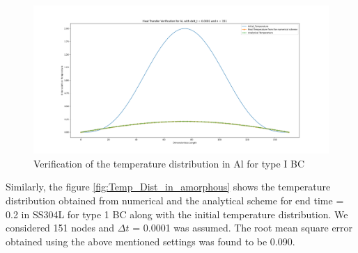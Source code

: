 \begin{figure}[h]
  \centering
  \includegraphics[width=15cm]{img/Al_Type1.png}
  \caption{Verification of the temperature distribution in Al for type I BC}
  \label{fig:Temp_Dist_in_crystal}
\end{figure}

Similarly, the figure \ref{fig:Temp_Dist_in_amorphous} shows the temperature distribution obtained from numerical and the analytical scheme for end time = 0.2 in SS304L for type 1 BC along with the initial temperature distribution. We considered 151 nodes and $\Delta t$ = 0.0001 was assumed. The root mean square error obtained using the above mentioned settings was found to be 0.090.

